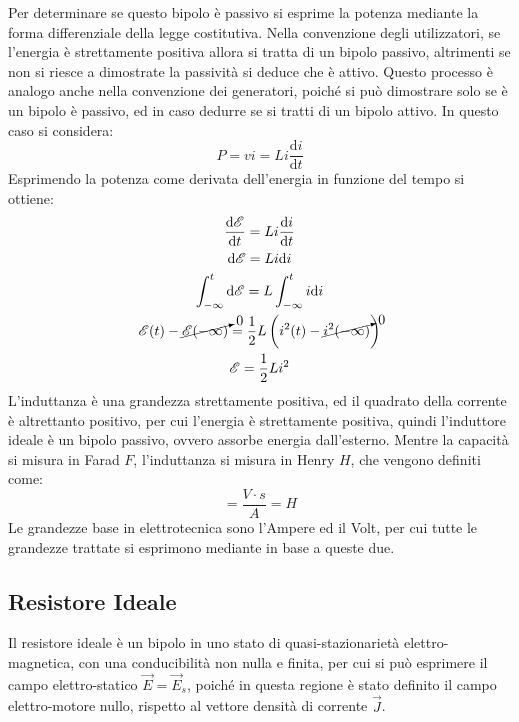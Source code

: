 \documentclass{article}
\newcommand{\df}{\mathrm{d}}
\numberwithin{equation}{subsection}
\begin{document}
Per determinare se questo bipolo è passivo si esprime la potenza mediante la forma differenziale della legge costitutiva. Nella convenzione degli utilizzatori, se l'energia 
è strettamente positiva allora si tratta di un bipolo passivo, altrimenti se non si riesce a dimostrate la passività si deduce che è attivo. Questo processo è analogo 
anche nella convenzione dei generatori, poiché si può dimostrare solo se è un bipolo è passivo, ed in caso dedurre se si tratti di un bipolo attivo. In questo caso si 
considera:
\begin{equation*}
    P=vi=Li\displaystyle\frac{\df i}{\df t}
\end{equation*}
Esprimendo la potenza come derivata dell'energia in funzione del tempo si ottiene:
\begin{gather*}
    \displaystyle\frac{\df\mathscr{E}}{\df t}=Li\frac{\df i}{\df t}\\
    \df\mathscr{E}=Li\df i\\
    \displaystyle\int_{-\infty}^t\df\mathscr{E}=L\int_{-\infty}^ti\df i\\
    \mathscr{E}(t)-\cancelto{0}{\mathscr{E}(-\infty)}=\displaystyle\frac{1}{2}L\left(i^2(t)-\cancelto{0}{i^2(-\infty)}\right)\\
    \mathscr{E}=\displaystyle\frac{1}{2}Li^2
\end{gather*}
L'induttanza è una grandezza strettamente positiva, ed il quadrato della corrente è altrettanto positivo, per cui l'energia è strettamente positiva, quindi l'induttore ideale 
è un bipolo passivo, ovvero assorbe energia dall'esterno. 
Mentre la capacità si misura in Farad $F$, l'induttanza si misura in Henry $H$, che vengono definiti come:
\begin{equation*}
    [L]=\displaystyle\frac{V\cdot s}{A}=H
\end{equation*}
Le grandezze base in elettrotecnica sono l'Ampere ed il Volt, per cui tutte le grandezze trattate si esprimono mediante in base a queste due. 

\subsection{Resistore Ideale}

Il resistore ideale è un bipolo in uno stato di quasi-stazionarietà elettro-magnetica, con una conducibilità non nulla e finita, per cui si può esprimere il campo 
elettro-statico $\vec{E}=\vec{E}_s$, poiché in questa regione è stato definito il campo elettro-motore nullo, rispetto al vettore densità di corrente $\vec{J}$.
\end{document}
